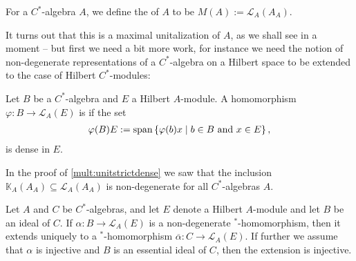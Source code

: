\begin{definition}
	For a $C^*$-algebra $A$, we define the  of $A$ to be $M(A):=\mathcal{L}_A(A_A)$.
\end{definition}
It turns out that this is a maximal unitalization of $A$, as we shall see in a moment -- but first we need a bit more work, for instance we need the notion of non-degenerate representations of a $C^*$-algebra on a Hilbert space to be extended to the case of Hilbert $C^*$-modules:
\begin{definition}
	Let $B$ be a $C^*$-algebra and $E$ a Hilbert $A$-module. A homomorphism $\varphi \colon B \to \mathcal{L}_A(E)$ is  if the set
	\begin{align*}
		\varphi(B)E:= \mathrm{span}\left\{ \varphi(b)x \mid b \in B  \text{ and } x \in E \right\},
	\end{align*}
	is dense in $E$. 
\end{definition}
\begin{example}
	In the proof of \ref{mult:unitstrictdense} we saw that the inclusion $\mathbb{K}_A(A_A) \subseteq \mathcal{L}_A(A_A)$ is non-degenerate for all $C^*$-algebras $A$.
	\label{mult:compnondeg}
\end{example}
\begin{proposition}
	Let $A$ and $C$ be $C^*$-algebras, and let $E$ denote a Hilbert $A$-module and let $B$ be an ideal of $C$. If $\alpha \colon B \to \mathcal{L}_A(E)$ is a non-degenerate  $^*$-homomorphism, then it extends uniquely to a $^*$-homomorphism $\overline \alpha \colon C \to \mathcal{L}_A(E)$. If further we assume that $\alpha$ is injective and $B$ is an essential ideal of $C$, then the extension is injective. 
	\label{mult:uniqueext}
\end{proposition}
